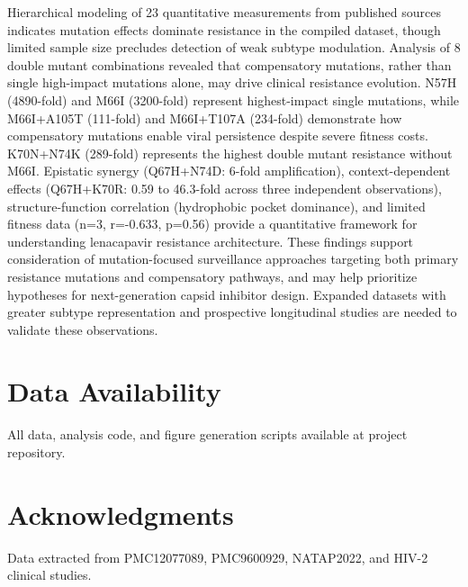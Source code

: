 \documentclass[preprint]{elsarticle}
\begin{document}
Hierarchical modeling of 23 quantitative measurements from published sources indicates mutation effects dominate resistance in the compiled dataset, though limited sample size precludes detection of weak subtype modulation. Analysis of 8 double mutant combinations revealed that compensatory mutations, rather than single high-impact mutations alone, may drive clinical resistance evolution. N57H (4890-fold) and M66I (3200-fold) represent highest-impact single mutations, while M66I+A105T (111-fold) and M66I+T107A (234-fold) demonstrate how compensatory mutations enable viral persistence despite severe fitness costs. K70N+N74K (289-fold) represents the highest double mutant resistance without M66I. Epistatic synergy (Q67H+N74D: 6-fold amplification), context-dependent effects (Q67H+K70R: 0.59 to 46.3-fold across three independent observations), structure-function correlation (hydrophobic pocket dominance), and limited fitness data (n=3, r=-0.633, p=0.56) provide a quantitative framework for understanding lenacapavir resistance architecture. These findings support consideration of mutation-focused surveillance approaches targeting both primary resistance mutations and compensatory pathways, and may help prioritize hypotheses for next-generation capsid inhibitor design. Expanded datasets with greater subtype representation and prospective longitudinal studies are needed to validate these observations.

\section*{Data Availability}
All data, analysis code, and figure generation scripts available at project repository.

\section*{Acknowledgments}
Data extracted from PMC12077089, PMC9600929, NATAP2022, and HIV-2 clinical studies.
\end{document}
